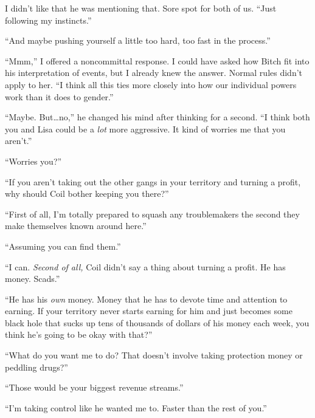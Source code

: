 I didn't like that he was mentioning that.  Sore spot for both of us.  ``Just following my instincts.''



``And maybe pushing yourself a little too hard, too fast in the process.''



``Mmm,'' I offered a noncommittal response.  I could have asked how Bitch fit into his interpretation of events, but I already knew the answer.  Normal rules didn't apply to her.  ``I think all this ties more closely into how our individual powers work than it does to gender.''



``Maybe.  But\ldots no,'' he changed his mind after thinking for a second.  ``I think both you and Lisa could be a \emph{lot} more aggressive.  It kind of worries me that you aren't.''



``Worries you?''



``If you aren't taking out the other gangs in your territory and turning a profit, why should Coil bother keeping you there?''



``First of all, I'm totally prepared to squash any troublemakers the second they make themselves known around here.''



``Assuming you can find them.''



``I can.  \emph{Second of all, }Coil didn't say a thing about turning a profit.  He has money.  Scads.''



``He has his \emph{own} money.  Money that he has to devote time and attention to earning.  If your territory never starts earning for him and just becomes some black hole that sucks up tens of thousands of dollars of his money each week, you think he's going to be okay with that?''



``What do you want me to do?  That doesn't involve taking protection money or peddling drugs?''



``Those would be your biggest revenue streams.''



``I'm taking control like he wanted me to.  Faster than the rest of you.''



